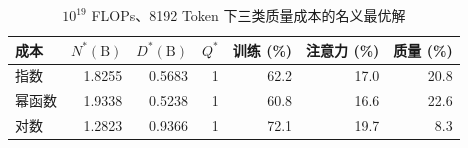 \begin{table}[H]\centering\small
\caption{$10^{19}$ FLOPs、8192 Token 下三类质量成本的名义最优解}\label{tab:q3-v39-cost}
\begin{tabular}{lrrrrrr}\toprule 成本 & $N^*(\text{B})$ & $D^*(\text{B})$ & $Q^*$ & 训练 (\%) & 注意力 (\%) & 质量 (\%)\\\midrule
指数 & 1.8255 & 0.5683 & 1 & 62.2 & 17.0 & 20.8 \\
幂函数 & 1.9338 & 0.5238 & 1 & 60.8 & 16.6 & 22.6 \\
对数 & 1.2823 & 0.9366 & 1 & 72.1 & 19.7 & 8.3 \\
\bottomrule\end{tabular}\end{table}
